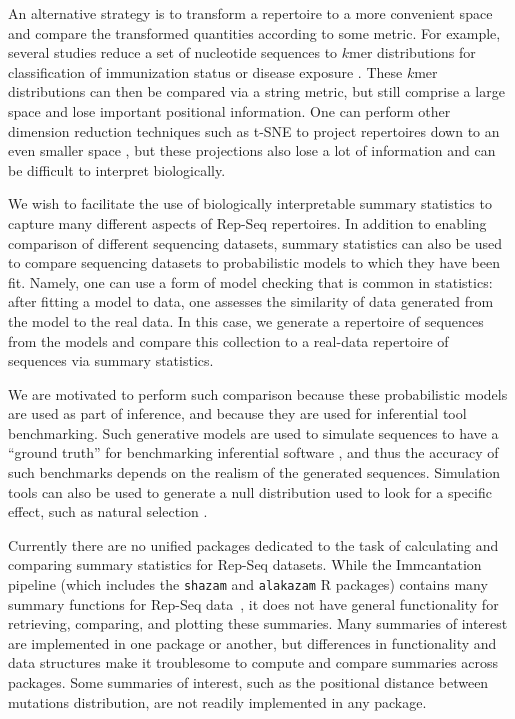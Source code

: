 \documentclass{article}
\begin{document}
An alternative strategy is to transform a repertoire to a more convenient space and compare the transformed quantities according to some metric.
For example, several studies reduce a set of nucleotide sequences to $k$mer distributions for classification of immunization status or disease exposure \cite{Madi2014-lt, Ostmeyer2017-xg, Heather2017pf}.
These $k$mer distributions can then be compared via a string metric, but still comprise a large space and lose important positional information.
One can perform other dimension reduction techniques such as t-SNE to project repertoires down to an even smaller space \cite{Yokota2017-zm}, but these projections also lose a lot of information and can be difficult to interpret biologically.

We wish to facilitate the use of biologically interpretable summary statistics to capture many different aspects of Rep-Seq repertoires.
In addition to enabling comparison of different sequencing datasets, summary statistics can also be used to compare sequencing datasets to probabilistic models to which they have been fit.
Namely, one can use a form of model checking that is common in statistics: after fitting a model to data, one assesses the similarity of data generated from the model to the real data.
In this case, we generate a repertoire of sequences from the models and compare this collection to a real-data repertoire of sequences via summary statistics.

We are motivated to perform such comparison because these probabilistic models are used as part of inference, and because they are used for inferential tool benchmarking.
Such generative models are used to simulate sequences to have a ``ground truth'' for benchmarking inferential software \cite{Ralph2016-iz,Gupta2017-ve,Marcou2018-du}, and thus the accuracy of such benchmarks depends on the realism of the generated sequences.
Simulation tools can also be used to generate a null distribution used to look for a specific effect, such as natural selection \cite{Yaari2012-kk}.

Currently there are no unified packages dedicated to the task of calculating and comparing summary statistics for Rep-Seq datasets.
While the Immcantation pipeline (which includes the \texttt{shazam} and \texttt{alakazam} R packages) contains many summary functions for Rep-Seq data~\cite{Gupta2015-iu}, it does not have general functionality for retrieving, comparing, and plotting these summaries.
Many summaries of interest are implemented in one package or another, but differences in functionality and data structures make it troublesome to compute and compare summaries across packages.
Some summaries of interest, such as the positional distance between mutations distribution, are not readily implemented in any package.
\end{document}
